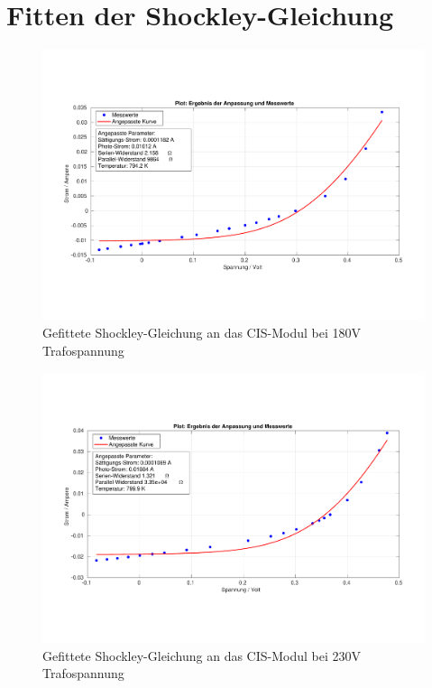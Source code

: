 \section{Fitten der Shockley-Gleichung}
\label{section:AnhangShock}

\begin{figure}[ht]
    \centering
    \includegraphics[width = \linewidth]{Bilder/CIS180Plot.pdf}
    \caption{Gefittete Shockley-Gleichung an das CIS-Modul bei 180V Trafospannung}    
\end{figure}

\begin{figure}[ht]
    \centering
    \includegraphics[width = \linewidth]{Bilder/CIS230Plot.pdf}
    \caption{Gefittete Shockley-Gleichung an das CIS-Modul bei 230V Trafospannung}
\end{figure}

